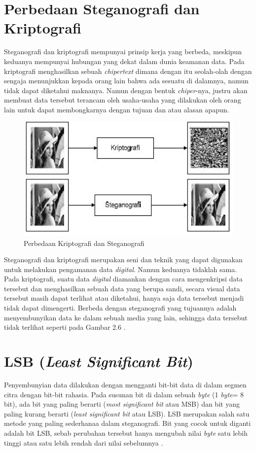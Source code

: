 \section{Perbedaan Steganografi dan Kriptografi}
Steganografi dan kriptografi mempunyai prinsip kerja yang berbeda, meskipun keduanya mempunyai hubungan yang dekat dalam dunia keamanan data. Pada kriptografi menghasilkan sebuah \emph{chipertext} dimana dengan itu seolah-olah dengan sengaja menunjukkan kepada orang lain bahwa ada sesuatu di dalamnya, namun tidak dapat diketahui maknanya. Namun dengan bentuk \emph{chiper}-nya, justru akan membuat data tersebut terancam oleh usaha-usaha yang dilakukan oleh orang lain untuk dapat membongkarnya dengan tujuan dan atau alasan apapun.
\begin{figure}[H]
	\centering
	\includegraphics[width=1\textwidth]{gambar/perbedaan_kripsteg}
	\caption{Perbedaan Kriptografi dan Steganografi}
	\label{perbedaan_kripsteg}
\end{figure}

Steganografi dan kriptografi merupakan seni dan teknik yang dapat digunakan untuk melakukan pengamanan data \emph{digital}. Namun keduanya tidaklah sama. Pada kriptografi, suatu data \emph{digital} diamankan dengan cara mengenkripsi data tersebut dan menghasilkan sebuah data yang berupa sandi, secara visual data tersebut masih dapat terlihat atau diketahui, hanya saja data tersebut menjadi tidak dapat dimengerti. Berbeda dengan steganografi yang tujuannya adalah menyembunyikan data ke dalam sebuah media yang lain, sehingga data tersebut tidak terlihat seperti pada Gambar 2.6 \cite{setiana}.

\section{LSB (\emph{Least Significant Bit})}
Penyembunyian data dilakukan dengan mengganti bit-bit data di dalam segmen citra dengan bit-bit rahasia. Pada susunan bit di dalam sebuah \emph{byte} (1 \emph{byte}= 8 bit), ada bit yang paling berarti (\emph{most significant bit} atau MSB) dan bit yang paling kurang berarti (\emph{least significant bit} atau LSB). LSB merupakan salah satu metode yang paling sederhanaa dalam steganografi. Bit yang cocok untuk diganti adalah bit LSB, sebab perubahan tersebut hanya mengubah nilai \emph{byte} satu lebih tinggi atau satu lebih rendah dari nilai sebelumnya \cite{munir}.

